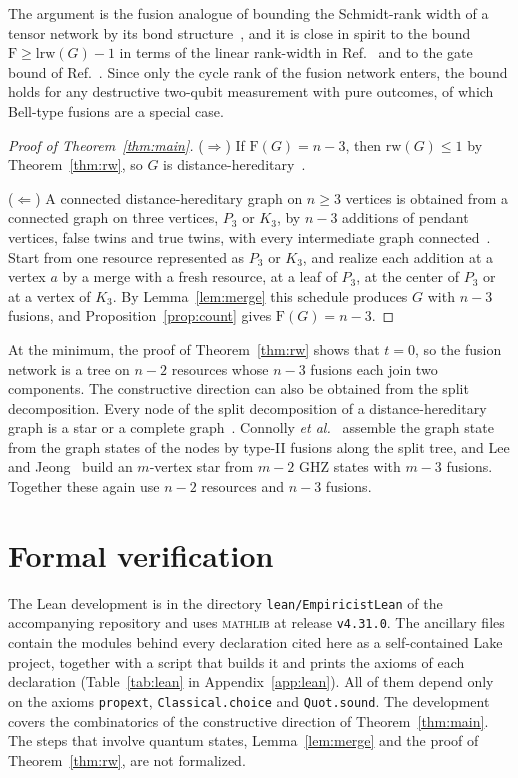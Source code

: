 \documentclass[aps,pra,onecolumn,superscriptaddress,nofootinbib,longbibliography]{revtex4-2}
\theoremstyle{plain}
\theoremstyle{remark}
\newcommand{\F}{\mathrm{F}}
\newcommand{\rw}{\mathrm{rw}}
\newcommand{\codeus}{\textunderscore\allowbreak}
\newcommand{\code}[1]{\texttt{\let\_\codeus #1}}
\begin{document}
The argument is the fusion analogue of bounding the Schmidt-rank width of a tensor network by its bond
structure~\cite{VandenNest2006universal,VandenNest2007classical}, and it is close in spirit to the bound
$\F\ge\mathrm{lrw}(G)-1$ in terms of the linear rank-width in Ref.~\cite{Lobl2025generating} and to the gate
bound of Ref.~\cite{Kumabe2026complexity}. Since only the cycle rank of the fusion network enters, the bound
holds for any destructive two-qubit measurement with pure outcomes, of which Bell-type fusions are a special
case.

\begin{proof}[Proof of Theorem~\ref{thm:main}]
($\Rightarrow$) If $\F(G)=n-3$, then $\rw(G)\le 1$ by Theorem~\ref{thm:rw}, so $G$ is
distance-hereditary~\cite{Oum2005rank}.

($\Leftarrow$) A connected distance-hereditary graph on $n\ge 3$ vertices is obtained from a connected
graph on three vertices, $P_3$ or $K_3$, by $n-3$ additions of pendant vertices, false twins and true twins,
with every intermediate graph connected~\cite{Bandelt1986distance}. Start from one resource represented as
$P_3$ or $K_3$, and realize each addition at a vertex $a$ by a merge with a fresh resource, at a leaf of
$P_3$, at the center of $P_3$ or at a vertex of $K_3$. By Lemma~\ref{lem:merge} this schedule produces $G$
with $n-3$ fusions, and Proposition~\ref{prop:count} gives $\F(G)=n-3$.
\end{proof}

At the minimum, the proof of Theorem~\ref{thm:rw} shows that $t=0$, so the fusion network is a tree on
$n-2$ resources whose $n-3$ fusions each join two components. The constructive direction can also be
obtained from the split decomposition. Every node of the split decomposition of a distance-hereditary graph
is a star or a complete graph~\cite{Bouchet1988transforming,Hammer1990completely,Gioan2012split}. Connolly
\emph{et al.}~\cite{Connolly2026efficient} assemble the graph state from the graph states of the nodes by
type-II fusions along the split tree, and Lee and Jeong~\cite{Lee2023graph} build an $m$-vertex star from
$m-2$ GHZ states with $m-3$ fusions. Together these again use $n-2$ resources and $n-3$ fusions.

\section{Formal verification}\label{sec:lean}

The Lean development is in the directory \code{lean/EmpiricistLean} of the accompanying repository and
uses \textsc{mathlib} at release \code{v4.31.0}. The ancillary files contain the modules behind every
declaration cited here as a self-contained Lake project, together with a script that builds it and prints
the axioms of each declaration (Table~\ref{tab:lean} in Appendix~\ref{app:lean}). All of them depend only
on the axioms \code{propext}, \code{Classical.choice} and \code{Quot.sound}. The development covers the
combinatorics of the constructive direction of Theorem~\ref{thm:main}. The steps that involve quantum
states, Lemma~\ref{lem:merge} and the proof of Theorem~\ref{thm:rw}, are not formalized.
\end{document}
